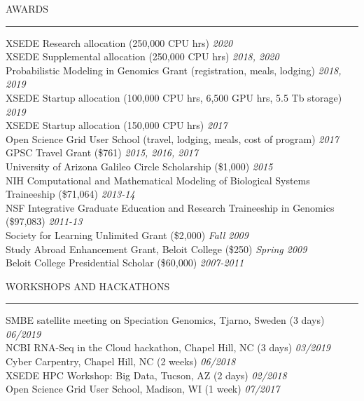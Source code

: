 \documentclass{resume} %
\renewenvironment{rSection}[1]{
\sectionskip
\textcolor{RoyalPurple}{\MakeUppercase{#1}}
\sectionlineskip
\hrule
\begin{list}{}{
\setlength{\leftmargin}{1.5em}
}
\item[]
}{
\end{list}
}
\begin{document}

\begin{rSection}{Awards}

XSEDE Research allocation (250,000 CPU hrs) \hfill{\em 2020}\\
XSEDE Supplemental allocation (250,000 CPU hrs) \hfill{\em 2018, 2020}\\
Probabilistic Modeling in Genomics Grant (registration, meals, lodging) \hfill{\em 2018, 2019}\\
XSEDE Startup allocation (100,000 CPU hrs, 6,500 GPU hrs, 5.5 Tb storage) \hfill{\em 2019}\\
XSEDE Startup allocation (150,000 CPU hrs) \hfill{\em 2017}\\
Open Science Grid User School (travel, lodging, meals, cost of program) \hfill{\em 2017}\\
GPSC Travel Grant (\$761) \hfill{\em 2015, 2016, 2017} \\
University of Arizona Galileo Circle Scholarship (\$1,000) \hfill{\em 2015} \\
NIH Computational and Mathematical Modeling of Biological Systems Traineeship (\$71,064) \hfill {\em 2013-14}\\
NSF Integrative Graduate Education and Research Traineeship in Genomics (\$97,083) \hfill {\em 2011-13}\\
Society for Learning Unlimited Grant (\$2,000) \hfill {\em Fall 2009}\\
Study Abroad Enhancement Grant, Beloit College (\$250) \hfill {\em Spring 2009}\\
Beloit College Presidential Scholar (\$60,000) \hfill {\em 2007-2011}

\end{rSection}




\begin{rSection}{Workshops and Hackathons}

SMBE satellite meeting on Speciation Genomics, Tjarno, Sweden (3 days) \hfill{\em 06/2019}\\
NCBI RNA-Seq in the Cloud hackathon, Chapel Hill, NC (3 days) \hfill {\em 03/2019}\\
Cyber Carpentry, Chapel Hill, NC (2 weeks) \hfill {\em 06/2018}\\
XSEDE HPC Workshop: Big Data, Tucson, AZ (2 days) \hfill {\em 02/2018}\\
Open Science Grid User School, Madison, WI (1 week) \hfill {\em 07/2017}

\end{rSection}
\end{document}
